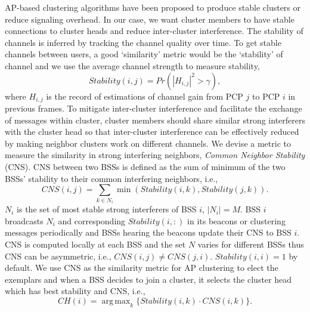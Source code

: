 \documentclass[10pt, conference, letterpaper]{IEEEtran}
\DeclareMathOperator*{\argmax}{arg\,max}
\begin{document}
AP-based clustering algorithms have been proposed to produce stable clusters \cite{apvanet} or reduce signaling overhead\cite{apd2d}. In our case, we want cluster members to have stable connections to cluster heads and reduce inter-cluster interference. The stability of channels is inferred by tracking the channel quality over time. To get stable channels between users, a good `similarity' metric would be the `stability' of channel and we use the average channel strength to measure stability,
 $$Stability(i,j)=Pr(|H_{i,j}|^2>\gamma),$$ 
where $H_{i,j}$ is the record of estimations of channel gain from PCP $j$ to PCP $i$ in previous frames. To mitigate inter-cluster interference and facilitate the exchange of messages within cluster, cluster members should share similar strong interferers with the cluster head so that inter-cluster interference can be effectively reduced by making neighbor clusters work on different channels. We devise a metric to measure the similarity in strong interfering neighbors, \emph{Common Neighbor Stability} (CNS). CNS between two BSSs is defined as the sum of minimum of the two BSSs' stability to their common interfering neighbors, i.e.,
\begin{equation}\label{eq:CNS}
CNS(i,j) = \sum_{k\in N_i}{\min(Stability(i,k), Stability(j,k))}.
\end{equation}
$N_i$ is the set of most stable strong interferers of BSS $i$, $|N_i| = M$. BSS $i$ broadcasts $N_i$ and corresponding $Stability(i,:)$ in its beacons or clustering messages periodically and BSSs hearing the beacons update their CNS to BSS $i$. CNS is computed locally at each BSS and the set $N$ varies for different BSSs thus CNS can be asymmetric, i.e., $CNS(i,j)\neq CNS(j,i)$.
$Stability(i,i) = 1$ by default. We use CNS as the similarity metric for AP clustering to elect the exemplars and when a BSS decides to join a cluster, it selects the cluster head which has best stability and CNS, i.e.,
$$CH(i) = \argmax_k \{Stability(i,k)\cdot CNS(i,k)\}.$$

\end{document}
